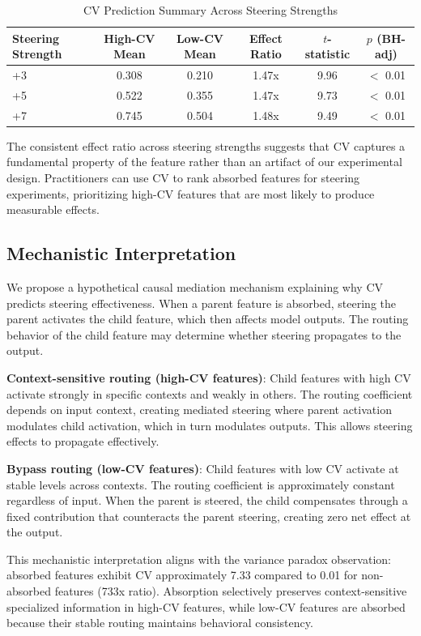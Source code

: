 \documentclass{article}
\begin{document}
\begin{table}[t]
\caption{CV Prediction Summary Across Steering Strengths}
\label{tab:cv_summary}
\centering
\small
\begin{tabular}{lccccc}
\toprule
Steering Strength & High-CV Mean & Low-CV Mean & Effect Ratio & $t$-statistic & $p$ (BH-adj) \\
\midrule
+3 & 0.308 & 0.210 & 1.47x & 9.96 & $<$ 0.01 \\
+5 & 0.522 & 0.355 & 1.47x & 9.73 & $<$ 0.01 \\
+7 & 0.745 & 0.504 & 1.48x & 9.49 & $<$ 0.01 \\
\bottomrule
\end{tabular}
\end{table}

The consistent effect ratio across steering strengths suggests that CV captures a fundamental property of the feature rather than an artifact of our experimental design. Practitioners can use CV to rank absorbed features for steering experiments, prioritizing high-CV features that are most likely to produce measurable effects.

\subsection{Mechanistic Interpretation}

We propose a hypothetical causal mediation mechanism explaining why CV predicts steering effectiveness. When a parent feature is absorbed, steering the parent activates the child feature, which then affects model outputs. The routing behavior of the child feature may determine whether steering propagates to the output.

\textbf{Context-sensitive routing (high-CV features)}: Child features with high CV activate strongly in specific contexts and weakly in others. The routing coefficient depends on input context, creating mediated steering where parent activation modulates child activation, which in turn modulates outputs. This allows steering effects to propagate effectively.

\textbf{Bypass routing (low-CV features)}: Child features with low CV activate at stable levels across contexts. The routing coefficient is approximately constant regardless of input. When the parent is steered, the child compensates through a fixed contribution that counteracts the parent steering, creating zero net effect at the output.

This mechanistic interpretation aligns with the variance paradox observation: absorbed features exhibit CV approximately 7.33 compared to 0.01 for non-absorbed features (733x ratio). Absorption selectively preserves context-sensitive specialized information in high-CV features, while low-CV features are absorbed because their stable routing maintains behavioral consistency.
\end{document}
